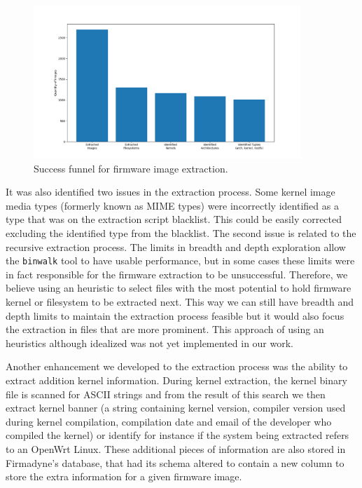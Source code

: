 \begin{figure}[h]
    \centering
    \includegraphics[width=0.90\textwidth]{figs/Funnel.png}
    \caption{Success funnel for firmware image extraction.}
    \label{fig:stats-funnel}
\end{figure}

It was also identified two issues in the extraction process. Some kernel image media types (formerly known as MIME types) were incorrectly identified as a type that was on the extraction script blacklist. This could be easily corrected excluding the identified type from the blacklist. The second issue is related to the recursive extraction process. The limits in breadth and depth exploration allow the {\tt binwalk} tool to have usable performance, but in some cases these limits were in fact responsible for the firmware extraction to be unsuccessful. Therefore, we believe using an heuristic to select files with the most potential to hold firmware kernel or filesystem to be extracted next. This way we can still have breadth and depth limits to maintain the extraction process feasible but it would also focus the extraction in files that are more prominent. This approach of using an heuristics although idealized was not yet implemented in our work.

Another enhancement we developed to the extraction process was the ability to extract addition kernel information. During kernel extraction, the kernel binary file is scanned for ASCII strings and from the result of this search we then extract kernel banner (a string containing kernel version, compiler version used during kernel compilation, compilation date and email of the developer who compiled the kernel) or identify for instance if the system being extracted refers to an OpenWrt Linux. These additional pieces of information are also stored in Firmadyne's \cite{firmadyne} database, that had its schema altered to contain a new column to store the extra information for a given firmware image.

